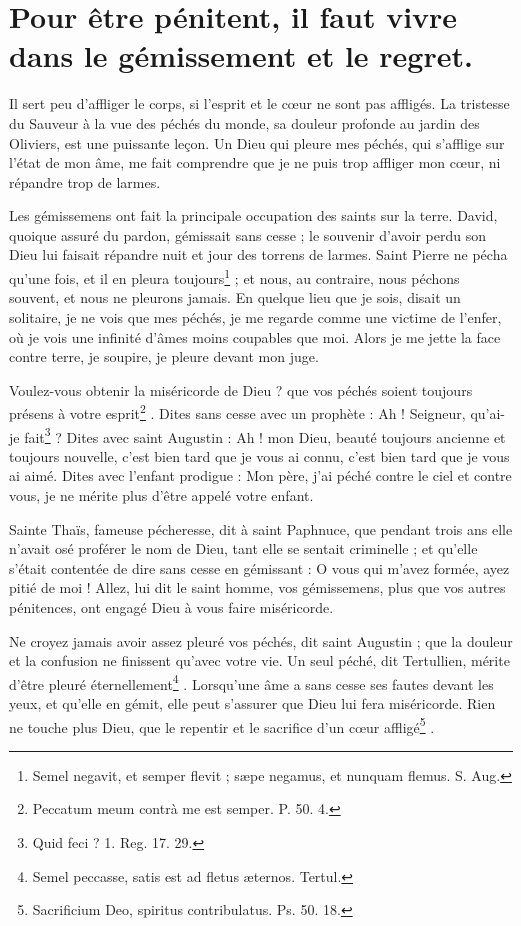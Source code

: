 \documentclass[instructions.tex]{subfiles}
\begin{document}
 
\chapter{Pour être pénitent, il faut vivre dans le gémissement et le regret.}
 
\primo Il sert peu d’affliger le corps, si l’esprit et le cœur ne sont pas affligés. La tristesse du Sauveur à la vue des péchés du monde, sa douleur profonde au jardin des Oliviers, est une puissante leçon. Un Dieu qui pleure mes péchés, qui s’afflige sur l’état de mon âme, me fait comprendre que je ne puis trop affliger mon cœur, ni répandre trop de larmes.
 
Les gémissemens ont fait la principale occupation des saints sur la terre. David, quoique assuré du pardon, gémissait sans cesse ; le souvenir d’avoir perdu son Dieu lui faisait répandre nuit et jour des torrens de larmes. Saint Pierre ne pécha qu’une fois, et il en pleura toujours\footnote{Semel negavit, et semper flevit ; sæpe negamus, et nunquam flemus. S. Aug.} ; et nous, au contraire, nous péchons souvent, et nous ne pleurons jamais. En quelque lieu que je sois, disait un solitaire, je ne vois que mes péchés, je me regarde comme une victime de l’enfer, où je vois une infinité d’âmes moins coupables que moi. Alors je me jette la face contre terre, je soupire, je pleure devant mon juge.
 
\secundo Voulez-vous obtenir la miséricorde de Dieu ? que vos péchés soient toujours présens à votre esprit\footnote{Peccatum meum contrà me est semper. P. 50. 4.} . Dites sans cesse avec un prophète : Ah ! Seigneur, qu’ai-je fait\footnote{Quid feci ? 1. Reg. 17. 29.} ? Dites avec saint Augustin : Ah ! mon Dieu, beauté toujours ancienne et toujours nouvelle, c’est bien tard que je vous ai connu, c’est bien tard que je vous ai aimé. Dites avec l’enfant prodigue : Mon père, j’ai péché contre le ciel et contre vous, je ne mérite plus d’être appelé votre enfant.
 
Sainte Thaïs, fameuse pécheresse, dit à saint Paphnuce, que pendant trois ans elle n’avait osé proférer le nom de Dieu, tant elle se sentait criminelle ; et qu’elle s’était contentée de dire sans cesse en gémissant : O vous qui m’avez formée, ayez pitié de moi ! Allez, lui dit le saint homme, vos gémissemens, plus que vos autres pénitences, ont engagé Dieu à vous faire miséricorde.
 
Ne croyez jamais avoir assez pleuré vos péchés, dit saint Augustin ; que la douleur et la confusion ne finissent qu’avec votre vie. Un seul péché, dit Tertullien, mérite d’être pleuré éternellement\footnote{Semel peccasse, satis est ad fletus æternos. Tertul.} . Lorsqu’une âme a sans cesse ses fautes devant les yeux, et qu’elle en gémit, elle peut s’assurer que Dieu lui fera miséricorde. Rien ne touche plus Dieu, que le repentir et le sacrifice d’un cœur affligé\footnote{Sacrificium Deo, spiritus contribulatus. Ps. 50. 18.} .
 
\end{document}
